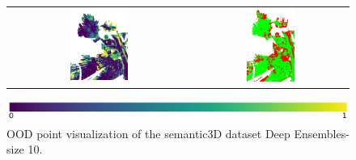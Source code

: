 \begin{figure}[h!]
\begin{tabular}{cc}
            \includegraphics[width=0.33\textwidth, height=0.18\textheight]{images/ood_imgs/fout_sem3d/fout_ent_3.pdf}& 
            \includegraphics[width=0.33\textwidth, height=0.18\textheight]{images/ood_imgs/fout_sem3d/fout_ent_ood_auroc_3.pdf}\\
        \end{tabular}
        \includegraphics[scale=0.45]{images/prob_legend.pdf}
        \caption{OOD point visualization of the semantic3D dataset Deep Ensembles-size 10.}
        \label{fig:fout_ood_auroc_sem3d_ent}
    \end{figure}

